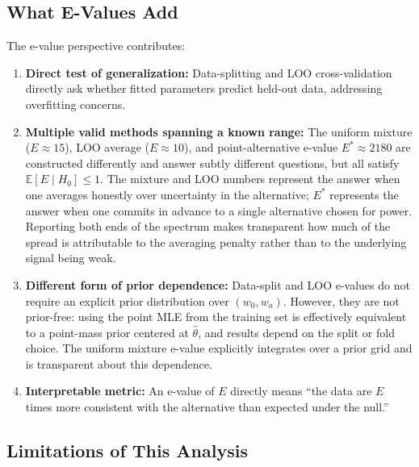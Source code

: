 \documentclass[11pt,a4paper]{article}
\newcommand{\E}{\mathbb{E}}
\begin{document}
\subsection{What E-Values Add}

The e-value perspective contributes:
\begin{enumerate}
    \item \textbf{Direct test of generalization:} Data-splitting and LOO cross-validation directly ask whether fitted parameters predict held-out data, addressing overfitting concerns.

    \item \textbf{Multiple valid methods spanning a known range:} The uniform mixture ($E \approx 15$), LOO average ($E \approx 10$), and point-alternative e-value $E^{*} \approx 2180$ are constructed differently and answer subtly different questions, but all satisfy $\E[E \mid H_0] \leq 1$. The mixture and LOO numbers represent the answer when one averages honestly over uncertainty in the alternative; $E^{*}$ represents the answer when one commits in advance to a single alternative chosen for power. Reporting both ends of the spectrum makes transparent how much of the spread is attributable to the averaging penalty rather than to the underlying signal being weak.

    \item \textbf{Different form of prior dependence:} Data-split and LOO e-values do not require an explicit prior distribution over $(w_0, w_a)$. However, they are not prior-free: using the point MLE from the training set is effectively equivalent to a point-mass prior centered at $\hat{\theta}$, and results depend on the split or fold choice. The uniform mixture e-value explicitly integrates over a prior grid and is transparent about this dependence.

    \item \textbf{Interpretable metric:} An e-value of $E$ directly means ``the data are $E$ times more consistent with the alternative than expected under the null.''
\end{enumerate}

\subsection{Limitations of This Analysis}
\label{sec:limitations}
\end{document}
